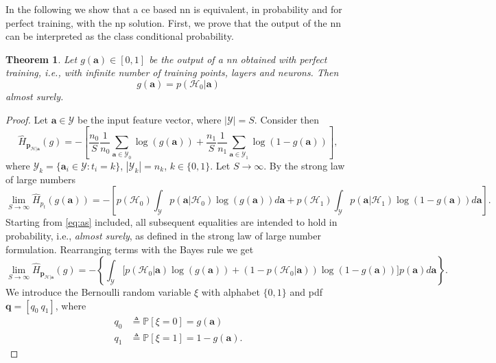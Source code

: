 \documentclass[conference,final]{IEEEtran}
\newcommand{\hatcross}[2]{\hat{H}_{#1}(#2)}
\newcommand{\gy}{g(\bm a)}
\newcommand{\pr}[1]{\mathbb{P} \left[ #1 \right]}
\newtheorem{theorem}{Theorem}
\begin{document}
In the following we show that a \ac{ce} based \ac{nn} is equivalent, in probability and for perfect training, with the \ac{np} solution. First, we prove that the output of the \ac{nn} can be interpreted as the class conditional probability. 
\begin{theorem}
Let $\gy \in [0,1]$ be the output of a \ac{nn} obtained with perfect training, i.e., with infinite number of training points, layers and neurons. Then
\begin{equation}
	\gy = p(\mathcal{H}_0|\bm a)	
\end{equation}
almost surely.
\end{theorem}
\begin{proof}
Let $\bm a \in \mathcal{Y}$ be the input feature vector, where $|\mathcal{Y}|=S$. Consider then 
\begin{equation}
	\hatcross{\bm p_{\mathcal{H}|\bm a}}{g} =  - \left[ \frac{n_0}{S} \frac{1}{n_0} \sum_{\bm a \in \mathcal{Y}_0} \log(\gy) 
		+ \frac{n_1}{S} \frac{1}{n_1} \sum_{\bm a \in \mathcal{Y}_1} \log(1-\gy) \right],	
\end{equation}
where $\mathcal{Y}_k = \{\bm a_i \in \mathcal{Y} : t_i = k\}$, $|\mathcal{Y}_k|=n_k$, $k \in \{0,1\}$.
Let $S \to \infty$. By the strong law of large numbers \cite{etemadi1981elementary}
\begin{equation}
\label{eq:as}
	\lim_{S \to \infty}	\hatcross{p_t}{\gy} = - \left[ p(\mathcal{H}_0) \int_{\mathcal{Y}} p(\bm a|\mathcal{H}_0) \log (\gy) d\bm a +  
		 p(\mathcal{H}_1) \int_{\mathcal{Y}} p(\bm a|\mathcal{H}_1) \log (1-\gy) d\bm a \right].
\end{equation}
Starting from \eqref{eq:as} included, all subsequent equalities are intended to hold in probability, i.e., \textit{almost surely}, as defined in the strong law of large number formulation.
Rearranging terms with the Bayes rule we get
\begin{equation}
\label{eq:dim1}
\lim_{S \to \infty}	\hatcross{\bm p_{\mathcal{H}|\bm a}}{g} = - \left\{ \int_{\mathcal{Y}} \bigl[ p(\mathcal{H}_0|\bm a) \log(\gy) + 
	(1-p(\mathcal{H}_0|\bm a)) \log(1-\gy)\bigr] p(\bm a)   d\bm a \right\}. 		
\end{equation}
We introduce the Bernoulli random variable $\xi$ with alphabet $ \{0,1\}$ and \ac{pdf} $\bm q = [q_0 \ q_1]$, where
\begin{subequations}
\label{eq:q}
\begin{align}
	q_0 &\triangleq \pr{\xi=0}=\gy \\
	q_1 &\triangleq \pr{\xi=1}=1-\gy.
\end{align}

\end{subequations}
\end{proof}
\end{document}
